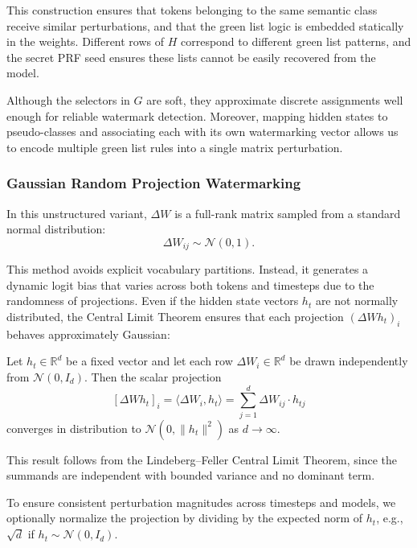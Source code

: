 This construction ensures that tokens belonging to the same semantic class receive similar perturbations, and that the green list logic is embedded statically in the weights. Different rows of \( H \) correspond to different green list patterns, and the secret PRF seed ensures these lists cannot be easily recovered from the model.

Although the selectors in \( G \) are soft, they approximate discrete assignments well enough for reliable watermark detection. Moreover, mapping hidden states to pseudo-classes and associating each with its own watermarking vector allows us to encode multiple green list rules into a single matrix perturbation.

\subsubsection*{Gaussian Random Projection Watermarking}

In this unstructured variant, \( \Delta W \) is a full-rank matrix sampled from a standard normal distribution:
\begin{equation}
    \Delta W_{ij} \sim \mathcal{N}(0, 1).
\end{equation}

This method avoids explicit vocabulary partitions. Instead, it generates a dynamic logit bias that varies across both tokens and timesteps due to the randomness of projections. Even if the hidden state vectors \( h_t \) are not normally distributed, the Central Limit Theorem ensures that each projection \( (\Delta W h_t)_i \) behaves approximately Gaussian:

\begin{theorem}
Let \( h_t \in \mathbb{R}^d \) be a fixed vector and let each row \( \Delta W_i \in \mathbb{R}^d \) be drawn independently from \( \mathcal{N}(0, I_d) \). Then the scalar projection
\[
[\Delta W h_t]_i = \langle \Delta W_i, h_t \rangle = \sum_{j=1}^d \Delta W_{ij} \cdot h_{tj}
\]
converges in distribution to \( \mathcal{N}(0, \|h_t\|^2) \) as \( d \to \infty \).
\end{theorem}

This result follows from the Lindeberg–Feller Central Limit Theorem, since the summands are independent with bounded variance and no dominant term.

To ensure consistent perturbation magnitudes across timesteps and models, we optionally normalize the projection by dividing by the expected norm of \( h_t \), e.g., \( \sqrt{d} \) if \( h_t \sim \mathcal{N}(0, I_d) \).

